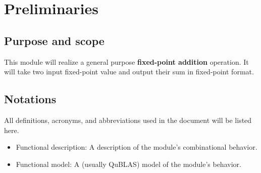 \documentclass[a4paper, oneside]{report}
\author{Bolin Li}
\date{2024/11/01}
\begin{document}
    \setmainfont{TeX Gyre Heros}
    \maketitle
    \tableofcontents
    \thispagestyle{empty}
    \clearpage
    \pagestyle{fancy}
    \setcounter{page}{1}
    \chapter{Preliminaries}
        \section{Purpose and scope}
        This module will realize a general purpose \textbf{fixed-point addition} operation. It will take two input fixed-point value and output their sum in fixed-point format.
        \section{Notations}
            All definitions, acronyms, and abbreviations used in the document will be listed here.
            \begin{itemize}
                \item Functional description: A description of the module's combinational behavior.
                \item Functional model: A (usually QuBLAS) model of the module's behavior.
            \end{itemize}
\end{document}
